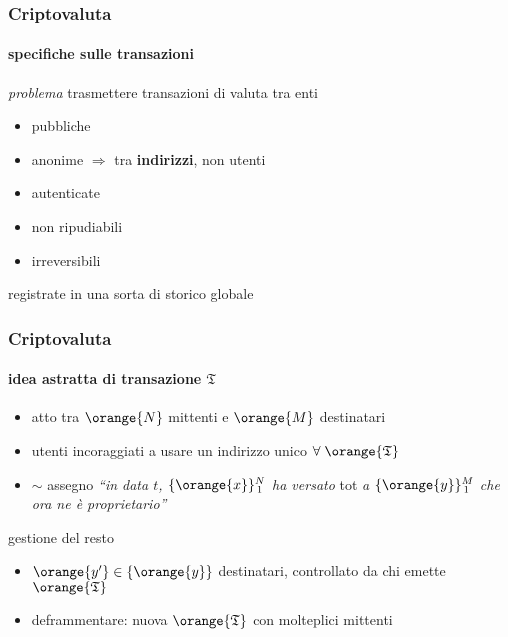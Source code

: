 \begin{frame}
	\frametitle{Criptovaluta}
	\framesubtitle{specifiche sulle transazioni}
	
	\textit{problema} \vspace{5pt}
	\newline trasmettere {\color{blue}transazioni} di valuta tra enti
	\begin{itemize}
	  \item pubbliche
	  \item anonime $\Rightarrow$ tra \textbf{indirizzi}, non utenti
	  \item autenticate
	  \item non ripudiabili
	  \item irreversibili
	\end{itemize}
	registrate in una sorta di {\color{blue} storico} globale
	
\end{frame}
	
\begin{frame}
	\frametitle{Criptovaluta}
	\framesubtitle{idea astratta di transazione $\mathfrak{T}$}
	
	\begin{itemize}
	  \item atto tra $\orange{N}$ mittenti e $\orange{M}$ destinatari
	  \item utenti incoraggiati a usare un indirizzo unico $\forall \;\orange{\mathfrak{T}}$
	  \item $\sim$ {\color{blue}assegno}
	  \newline \textit{``in data $t$, $\{\orange{x}\}_{\,1}^N$ ha versato} tot \textit{a $\{\orange{y}\}_{\,1}^M$ che ora ne è proprietario''}
	\end{itemize}
	gestione del {\color{blue}resto}
	\begin{itemize}
		\item $\orange{y'}\in\{\orange{y}\}$ destinatari, controllato da chi
		emette $\orange{\mathfrak{T}}$
		\item deframmentare: nuova $\orange{\mathfrak{T}}$ con molteplici mittenti
	\end{itemize}
\end{frame}